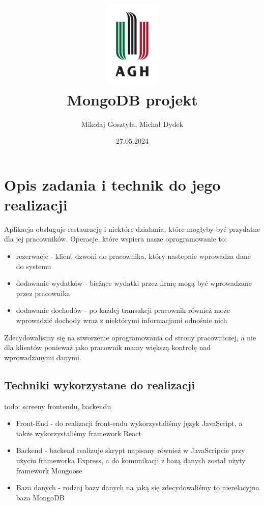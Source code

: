 \documentclass[12pt]{article}
\title{\includegraphics[width=0.2\textwidth]{agh.jpg} \\ \textbf{MongoDB projekt}}
\author{Mikołaj Gosztyła, Michał Dydek}
\date{27.05.2024}
\begin{document}
\maketitle

\hypersetup{
    linktoc=all
}
\tableofcontents

\newpage
\section{Opis zadania i technik do jego realizacji}
Aplikacja obsługuje restaurację i niektóre działania, które mogłyby być przydatne dla jej pracowników. Operacje, które wspiera nasze oprogramowanie to: 
\begin{itemize}
	\item rezerwacje - klient dzwoni do pracownika, który nastepnie wprowadza dane do systemu
	\item dodawanie wydatków - bieżące wydatki przez firmę mogą być wprowadzane przez pracownika
	\item dodawanie dochodów - po każdej transakcji pracownik również może wprowadzić dochody wraz z niektórymi informacjami odnośnie nich 
\end{itemize}

Zdecydowalismy się na stworzenie oprogramowania od strony pracowniczej, a nie dla klientów ponieważ jako pracownik mamy większą kontrolę nad wprowadzanymi danymi.

\subsection{Techniki wykorzystane do realizacji}
todo: screeny frontendu, backendu
\begin{itemize}
	\item Front-End - do realizacji front-endu wykorzystaliśmy język JavaScript, a także wykorzystaliśmy framework React
	\item Backend - backend realizuje skrypt napisany również w JavaScripcie przy użyciu frameworka Express, a do komunikacji z bazą danych został użyty framework Mongoose
	\item Baza danych - rodzaj bazy danych na jaką się zdecydowaliśmy to nierelacyjna baza MongoDB 
\end{itemize}

\newpage
\end{document}
